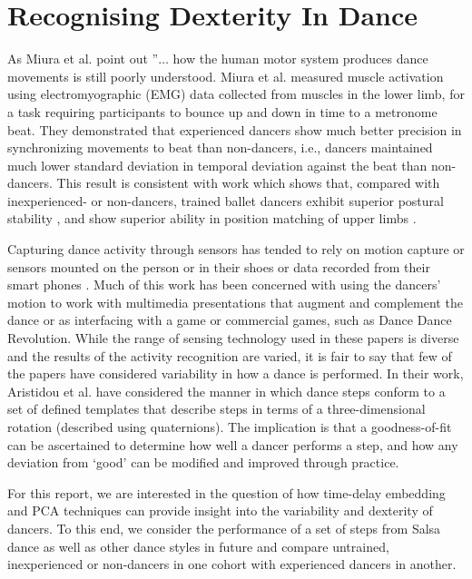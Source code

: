 \documentclass[10pt,journal,compsoc]{IEEEtran}
\begin{document}
\section{Recognising Dexterity In Dance }
As Miura et al. \cite{Miura2015} point out ''$\ldots$ how the human motor system produces 
dance movements is still poorly understood. 
Miura et al. \cite{Miura2013} measured muscle activation using electromyographic 
(EMG) data collected from muscles in the lower limb, for a task requiring participants to 
bounce up and down in time to a metronome beat.  
They demonstrated that experienced dancers show much better precision in synchronizing 
movements to beat than non-dancers, i.e., dancers maintained much lower standard 
deviation in temporal deviation against the beat than non-dancers. 
This result is consistent with work which shows that, compared with inexperienced- or 
non-dancers, trained ballet dancers exhibit superior postural 
stability \cite{Crotts1996}, and show superior ability in position matching 
of upper limbs \cite{Ramsay2001}.

Capturing dance activity through sensors has tended to rely on motion capture 
\cite{Alexiadis2014} or sensors mounted on the person \cite{Lynch2005} 
or in their shoes \cite{Paradiso1997} or data recorded from their smart phones \cite{Wei2014}.
Much of this work has been concerned with using the dancers' motion to work with 
multimedia presentations that augment and complement the dance \cite{Griffith1998, Park2006}
or as interfacing with a game \cite{Chu2012} or commercial games, such as Dance Dance Revolution.  
While the range of sensing technology used in these papers is diverse and the results 
of the activity recognition are varied, it is fair to say that few of the papers have considered 
variability in how a dance is performed. 
In their work, Aristidou et al. \cite{Aristidou2014}
have considered the manner in which dance steps conform to a set of defined 
templates that describe steps in terms of a three-dimensional rotation (described using quaternions).  
The implication is that a goodness-of-fit can be ascertained to determine how well a dancer 
performs a step, and how any deviation from ‘good’ can be modified and improved through practice. 

For this report, we are interested in the question of how time-delay embedding and PCA
techniques can provide insight into the variability and dexterity of dancers. 
To this end, we consider the performance of a set of steps from Salsa dance 
as well as other dance styles in future and 
compare untrained, inexperienced or non-dancers in one cohort with experienced dancers in another.
\end{document}

